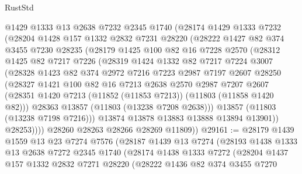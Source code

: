\begin{lexlean}{RustStd}
\begin{coremodule}
        @1429
        @1333
        @13
        @2638
        @7232
        @2345
        @1740
        (@28174
          @1429
          @1333
          @7232
          (@28204
            @1428
            @157
            @1332
            @2832
            @7231
            @28220
            (@28222
              @1427
              @82
              @374
              @3455
              @7230
              @28235
              (@28179
                @1425
                @100
                @82
                @16
                @7228
                @2570
                (@28312
                  @1425
                  @82
                  @7217
                  @7226
                  (@28319
                    @1424
                    @1332
                    @82
                    @7217
                    @7224
                    @3007
                    (@28328
                      @1423
                      @82
                      @374
                      @2972
                      @7216
                      @7223
                      @2987
                      @7197
                      @2607
                      @28250
                      (@28327
                        @1421
                        @100
                        @82
                        @16
                        @7213
                        @2638
                        @2570
                        @2987
                        @7207
                        @2607
                        (@28351 @1420 @7213 (@11852 (@11853 @7213)) (@11803 (@11858 @1420 @82)))
                        @28363
                        @13857
                        (@11803 (@13238 @7208 @2638)))
                      @13857
                      (@11803 (@13238 @7198 @7216)))
                    @13874
                    @13878
                    @13883
                    @13888
                    @13894
                    @13901))
                @28253))))
        @28260
        @28263
        @28266
        @28269
        @11809))
@29161 := @28179
    @1439
    @1559
    @13
    @23
    @7274
    @7576
    (@28187
      @1439
      @13
      @7274
      (@28193
        @1438
        @1333
        @13
        @2638
        @7272
        @2345
        @1740
        (@28174
          @1438
          @1333
          @7272
          (@28204
            @1437
            @157
            @1332
            @2832
            @7271
            @28220
            (@28222
              @1436
              @82
              @374
              @3455
              @7270

\end{coremodule}
\end{lexlean}
